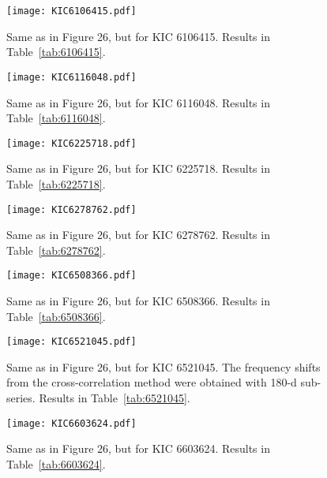 \documentclass[twocolumn]{aastex61}%
\begin{document}
\begin{figure}[ht]
\texttt{[image: KIC6106415.pdf]}
\caption{Same as in Figure 26, but for KIC 6106415. Results in Table~\ref{tab:6106415}.}\label{fig:6106415}
\end{figure}

\begin{figure}[ht]
\texttt{[image: KIC6116048.pdf]}
\caption{Same as in Figure 26, but for KIC 6116048. Results in Table~\ref{tab:6116048}.}\label{fig:6116048}
\end{figure}


\begin{figure}[ht]
\texttt{[image: KIC6225718.pdf]}\vspace{-0.2cm}
\caption{Same as in Figure 26, but for KIC 6225718. Results in Table~\ref{tab:6225718}.}\label{fig:6225718}
\end{figure}

\begin{figure}[ht]
\texttt{[image: KIC6278762.pdf]}\vspace{-0.2cm}
\caption{Same as in Figure 26, but for KIC 6278762. Results in Table~\ref{tab:6278762}.}\label{fig:6278762}\vspace{-1.5cm}
\end{figure}

\begin{figure}[ht]
\texttt{[image: KIC6508366.pdf]}
\caption{Same as in Figure 26, but for KIC 6508366. Results in Table~\ref{tab:6508366}.}\label{fig:6508366}
\end{figure}

\begin{figure}[ht]
\texttt{[image: KIC6521045.pdf]}\vspace{-0.2cm}
\caption{Same as in Figure 26, but for KIC 6521045. The frequency shifts from the cross-correlation method were obtained with 180-d sub-series. Results in Table~\ref{tab:6521045}.}\label{fig:6521045}\vspace{-0.3cm}
\end{figure}

\begin{figure}[ht]
\texttt{[image: KIC6603624.pdf]}\vspace{-0.2cm}
\caption{Same as in Figure 26, but for KIC 6603624. Results in Table~\ref{tab:6603624}.}\label{fig:6603624}\vspace{-1cm}
\end{figure}
\end{document}
